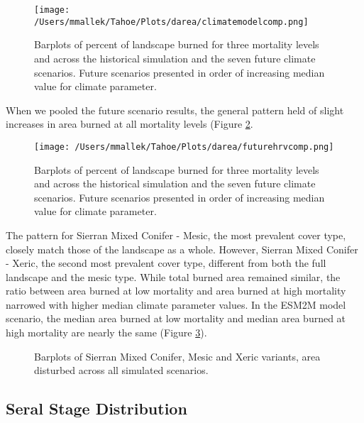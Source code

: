 \documentclass[12pt]{article}
\begin{document}
\begin{spacing}{1}
\begin{figure}[!htbp]
\centering
\texttt{[image: /Users/mmallek/Tahoe/Plots/darea/climatemodelcomp.png]}
\caption{Barplots of percent of landscape burned for three mortality levels and across the historical simulation and the seven future climate scenarios. Future scenarios presented in order of increasing median value for climate parameter.}
\label{climatemodelcomp}
\end{figure}

When we pooled the future scenario results, the general pattern held of slight increases in area burned at all mortality levels (Figure \ref{futurehrvcomp}.

\begin{figure}[!htbp]
\centering
\texttt{[image: /Users/mmallek/Tahoe/Plots/darea/futurehrvcomp.png]}
\caption{Barplots of percent of landscape burned for three mortality levels and across the historical simulation and the seven future climate scenarios. Future scenarios presented in order of increasing median value for climate parameter.}
\label{futurehrvcomp}
\end{figure}

The pattern for Sierran Mixed Conifer - Mesic, the most prevalent cover type, closely match those of the landscape as a whole. However, Sierran Mixed Conifer - Xeric, the second most prevalent cover type, different from both the full landscape and the mesic type. While total burned area remained similar, the ratio between area burned at low mortality and area burned at high mortality narrowed with higher median climate parameter values. In the ESM2M model scenario, the median area burned at low mortality and median area burned at high mortality are nearly the same (Figure \ref{fig:dareacomp_smc}).

\begin{figure}[!htbp]
  \centering
  \qquad
    \caption{Barplots of Sierran Mixed Conifer, Mesic and Xeric variants, area disturbed across all simulated scenarios.}
  \label{fig:dareacomp_smc}
\end{figure}

\subsection*{Seral Stage Distribution}


\end{spacing}
\end{document}
